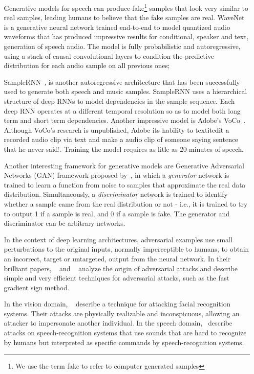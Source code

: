 Generative models for speech can produce fake\footnote{We use the term fake to refer to
computer generated samples} samples that look very similar to real samples,
leading humans to believe that the fake samples are real.
WaveNet~\cite{van2016wavenet} is a generative neural network trained end-to-end
to model quantized audio waveforms that has produced impressive results for conditional, speaker and text, generation of speech audio. The model is fully probabilistic and autoregressive, using a stack of causal convolutional layers to condition the predictive distribution for each audio sample on all previous ones; 

SampleRNN~\cite{mehri2016samplernn}, is another autoregressive architecture that
has been successfully used to generate both speech and music samples. SampleRNN
uses a hierarchical structure of deep RNNs to model dependencies in the sample
sequence. Each deep RNN operates at a different temporal resolution so as to
model both long term and short term dependencies. Another impressive model is
Adobe's VoCo~\cite{adobe2017voco}. Although VoCo's research is unpublished,
Adobe its hability to textit{edit a recorded audio clip via text and make
a audio clip of someone saying sentence that he never said!}. Training the model
requires as litle as 20 minutes of speech.

Another interesting framework for generative models are Generative Adversarial
Networks (GAN) framework proposed by~\cite{goodfellow2014generative}, in which a
\textit{generator} network is trained to learn a function from noise to samples
that approximate the real data distribution. Simultaneously, a
\textit{discriminator} network is trained to identify whether a sample came from
the real distribution or not - i.e., it is trained to try to output 1 if a sample is real, and 0 if a sample is fake. The generator and discriminator can be arbitrary networks.

In the context of deep learning architectures, adversarial examples use small
perturbations to the original inputs, normally imperceptible to humans, to
obtain an incorrect, target or untargeted, output from the neural network. In
their brilliant papers, ~\cite{szegedy2013intriguing} and
~\cite{goodfellow2014explaining} analyze the origin of adversarial attacks and
describe simple and very efficient techniques for adversarial attacks, such as the fast gradient sign method. 

In the vision domain, ~\cite{sharif2016accessorize} describe a technique for attacking facial recognition systems. Their attacks are physically realizable and inconspicuous, allowing an attacker to impersonate another individual. In the speech domain,~\cite{carlini2016hidden} describe attacks on speech-recognition systems that use sounds that are hard to recognize by humans but interpreted as specific commands by speech-recognition systems.
